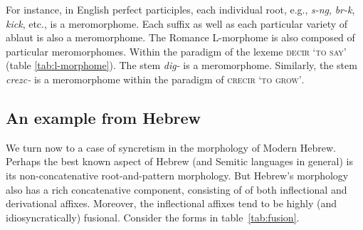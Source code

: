 For instance, in English perfect participles, each individual root, e.g., \textit{s-ng}, 
\textit{br-k}, \textit{kick}, etc., is a meromorphome. Each suffix 
as well as each particular variety of ablaut is also a meromorphome. 
The Romance L-morphome is also composed of particular meromorphomes. 
Within the paradigm of the lexeme \textsc{decir} \textsc{`to say'} 
(table \ref{tab:l-morphome}). The stem \textit{dig-} is a meromorphome. 
Similarly, the stem \textit{crezc-} is a meromorphome within the paradigm of 
\textsc{crecir} \textsc{`to grow'}.

\begin{table}[ht]
\begin{center}
\label{tab:fusion}
\caption{Fusional suffixes in Hebrew nominals}
\end{center}
\end{table}

\subsection{An example from Hebrew}
\label{sec:heb-example}
We turn now to a case of syncretism in the morphology of Modern Hebrew. Perhaps
the best known aspect of Hebrew (and Semitic languages in general) is its 
non-concatenative root-and-pattern morphology. But 
Hebrew's morphology also has a rich concatenative component, consisting of
of both inflectional and derivational affixes. Moreover, the inflectional affixes tend to be
highly (and idiosyncratically) fusional.  
Consider the forms in table~\ref{tab:fusion}. 

